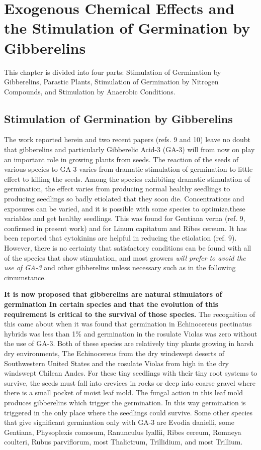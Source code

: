 \chapter[Exogenous Chemical Effects]{Exogenous Chemical Effects and the Stimulation of Germination by Gibberelins}

This chapter is divided into four parts: Stimulation of Germination by
Gibberelins, Parastic Plants, Stimulation of Germination by Nitrogen Compounds, and
Stimulation by Anaerobic Conditions.

\section[Gibberelins]{Stimulation of Germination by Gibberelins}

The work reported herein
and two recent papers (refs. 9 and 10) leave no doubt that gibberelins and particularly
Gibberelic Acid-3 (GA-3) will from now on play an important role in growing plants from
seeds. The reaction of the seeds of various species to GA-3 varies from dramatic
stimulation of germination to little effect to killing the seeds. Among the species
exhibiting dramatic stimulation of germination, the effect varies from producing normal
healthy seedlings to producing seedlings so badly etiolated that they soon die.
Concentrations and exposures can be varied, and it is possible with some species to
optimize.these variables and get healthy seedlings. This was found for Gentiana
verna (ref. 9, confirmed in present work) and for Linum capitatum and Ribes cereum. It
has been reported that cytokinins are helpful in reducing the etiolation (ref. 9).
However, there is no certainty that satisfactory conditions can be found with all of the
species that show stimulation, and most growers \textit{will prefer to avoid the use of GA-3}
and other gibberelins unless necessary such as in the following circumstance.

\textbf{It is now proposed that gibberelins are natural stimulators of
germination In certain species and that the evolution of this requirement
is critical to the survival of those species.} The recognition of this came about
when it was found that germination in Echinocereus pectinatus hybrids was less than
1\% and germination in the rosulate Violas was zero without the use of GA-3. Both of
these species are relatively tiny plants growing in harsh dry environments, The
Echinocereus from the dry windswept deserts of Southwestern United States and the
rosulate Violas from high in the dry windswept Chilean Andes. For these tiny
seedlings with their tiny root systems to survive, the seeds must fall into crevices in
rocks or deep into coarse gravel where there is a small pocket of moist leaf mold. The
fungal action in this leaf mold produces gibberelins which trigger the germination. In
this way germination is triggered in the only place where the seedlings could survive.
Some other species that give significant germination only with GA-3 are Evodia
danielli, some Gentiana, Physoplexis comosum, Ranunculus lyallii, Ribes cereum,
Romneya coulteri, Rubus parviflorum, most Thalictrum, Trillidium, and most Trillium.

